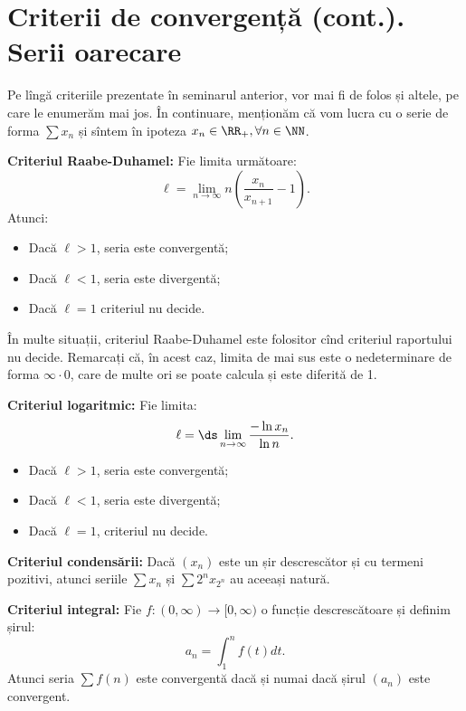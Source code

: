 \chapter{Criterii de convergență (cont.). Serii oarecare}

Pe lîngă criteriile prezentate în seminarul anterior, vor mai fi de folos
și altele, pe care le enumerăm mai jos. În continuare, menționăm că
vom lucra cu o serie de forma $ \sum x_n $ și sîntem în ipoteza
$ x_n \in \RR_+, \forall n \in \NN $.

\textbf{Criteriul Raabe-Duhamel:} Fie limita următoare:
\[
    \ell = \lim_{n \to \infty} n \left( \dfrac{x_n}{x_{n+1}} - 1 \right).
\]
Atunci:
\begin{itemize}
    \item Dacă $ \ell > 1 $, seria este convergentă;
    \item Dacă $ \ell < 1 $, seria este divergentă;
    \item Dacă $ \ell = 1 $ criteriul nu decide.
\end{itemize}

În multe situații, criteriul Raabe-Duhamel este folositor cînd criteriul
raportului nu decide. Remarcați că, în acest caz, limita de mai sus
este o nedeterminare de forma $ \infty \cdot 0 $, care de multe ori
se poate calcula și este diferită de 1.

\vspace{1cm}

\textbf{Criteriul logaritmic:} Fie limita:
\[
  \ell = \ds\lim_{n \to \infty} \dfrac{- \ln x_n}{\ln n}.
\]
\begin{itemize}
    \item Dacă $ \ell > 1 $, seria este convergentă;
    \item Dacă $ \ell < 1 $, seria este divergentă;
    \item Dacă $ \ell = 1 $, criteriul nu decide.
\end{itemize}

\vspace{1cm}

\textbf{Criteriul condensării:} Dacă $ (x_n) $ este un șir
descrescător și cu termeni pozitivi, atunci seriile $ \sum x_n $ și
$ \sum 2^n x_{2^n} $ au aceeași natură.

\vspace{1cm}

\textbf{Criteriul integral:} Fie $ f : (0, \infty) \to [0, \infty) $ o funcție
descrescătoare și definim șirul:
\[
    a_n = \int_1^n f(t) dt.
\]
Atunci seria $ \sum f(n) $ este convergentă dacă și numai dacă șirul $ (a_n) $ este
convergent.

